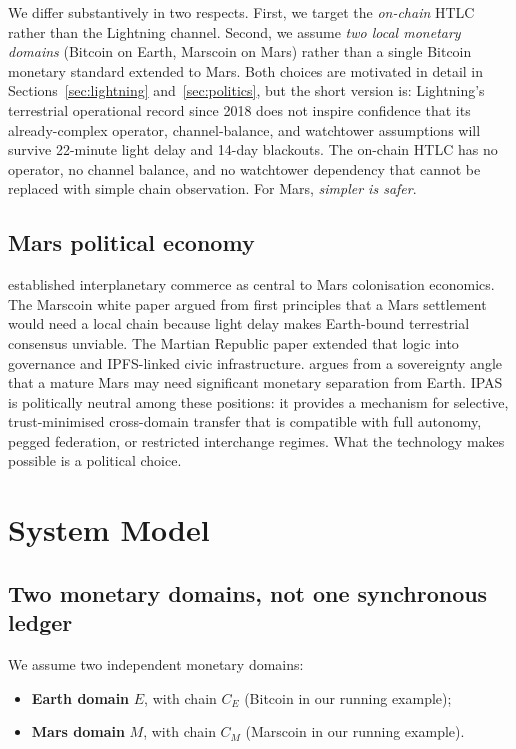 \documentclass[11pt]{article}
\begin{document}
We differ substantively in two respects. First, we target the \emph{on-chain} HTLC rather than the Lightning channel. Second, we assume \emph{two local monetary domains} (Bitcoin on Earth, Marscoin on Mars) rather than a single Bitcoin monetary standard extended to Mars. Both choices are motivated in detail in Sections~\ref{sec:lightning} and~\ref{sec:politics}, but the short version is: Lightning's terrestrial operational record since 2018 does not inspire confidence that its already-complex operator, channel-balance, and watchtower assumptions will survive 22-minute light delay and 14-day blackouts. The on-chain HTLC has no operator, no channel balance, and no watchtower dependency that cannot be replaced with simple chain observation. For Mars, \emph{simpler is safer}.

\subsection{Mars political economy}

\citet{zubrin1995} established interplanetary commerce as central to Mars colonisation economics. The Marscoin white paper \citep{lopin2014marscoin} argued from first principles that a Mars settlement would need a local chain because light delay makes Earth-bound terrestrial consensus unviable. The Martian Republic paper \citep{lopin2022martianrepublic} extended that logic into governance and IPFS-linked civic infrastructure. \citet{haqqmisra2024} argues from a sovereignty angle that a mature Mars may need significant monetary separation from Earth. IPAS is politically neutral among these positions: it provides a mechanism for selective, trust-minimised cross-domain transfer that is compatible with full autonomy, pegged federation, or restricted interchange regimes. What the technology makes possible is a political choice.

\section{System Model}
\label{sec:model}

\subsection{Two monetary domains, not one synchronous ledger}

We assume two independent monetary domains:
\begin{itemize}
  \item \textbf{Earth domain} $E$, with chain $C_E$ (Bitcoin in our running example);
  \item \textbf{Mars domain} $M$, with chain $C_M$ (Marscoin in our running example).
\end{itemize}
\end{document}
